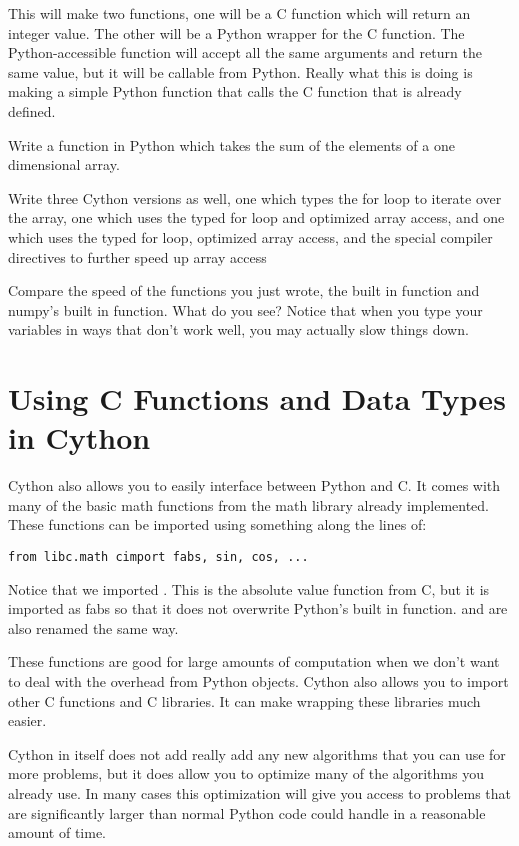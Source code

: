 This will make two functions, one will be a C function which will return an integer value.
The other will be a Python wrapper for the C function.
The Python-accessible function will accept all the same arguments and return the same value, but it will be callable from Python.
Really what this is doing is making a simple Python function that calls the C function that is already defined.

\begin{problem}

Write a function in Python which takes the sum of the elements of a one dimensional array.

Write three Cython versions as well, one which types the for loop to iterate over the array, one which uses the typed for loop and optimized array access, and one which uses the typed for loop, optimized array access, and the special compiler directives to further speed up array access

Compare the speed of the functions you just wrote, the built in  function and numpy's built in  function.
What do you see?
Notice that when you type your variables in ways that don't work well, you may actually slow things down.

\end{problem}

\section*{Using C Functions and Data Types in Cython}

Cython also allows you to easily interface between Python and C.
It comes with many of the basic math functions from the math library already implemented.
These functions can be imported using something along the lines of:
\begin{lstlisting}
from libc.math cimport fabs, sin, cos, ...
\end{lstlisting}

Notice that we imported .
This is the absolute value function from C, but it is imported as fabs so that it does not overwrite Python's built in  function. 
 and  are also renamed the same way.

These functions are good for large amounts of computation when we don't want to deal with the overhead from Python objects.
Cython also allows you to import other C functions and C libraries.
It can make wrapping these libraries much easier.

Cython in itself does not add really add any new algorithms that you can use for more problems, but it does allow you to optimize many of the algorithms you already use.
In many cases this optimization will give you access to problems that are significantly larger than normal Python code could handle in a reasonable amount of time.

